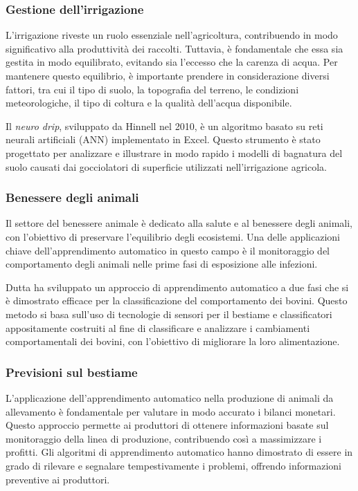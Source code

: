 \subsubsection{Gestione dell'irrigazione}

L'irrigazione riveste un ruolo essenziale nell'agricoltura, contribuendo in modo significativo alla produttività dei raccolti. Tuttavia, è fondamentale che essa sia gestita in modo equilibrato, evitando sia l'eccesso che la carenza di acqua. Per mantenere questo equilibrio, è importante prendere in considerazione diversi fattori, tra cui il tipo di suolo, la topografia del terreno, le condizioni meteorologiche, il tipo di coltura e la qualità dell'acqua disponibile.

Il \textit{neuro drip}, sviluppato da Hinnell nel 2010, è un algoritmo basato su reti neurali artificiali (ANN) implementato in Excel. Questo strumento è stato progettato per analizzare e illustrare in modo rapido i modelli di bagnatura del suolo causati dai gocciolatori di superficie utilizzati nell'irrigazione agricola.

\subsubsection{Benessere degli animali}

Il settore del benessere animale è dedicato alla salute e al benessere degli animali, con l'obiettivo di preservare l'equilibrio degli ecosistemi. Una delle applicazioni chiave dell'apprendimento automatico in questo campo è il monitoraggio del comportamento degli animali nelle prime fasi di esposizione alle infezioni.

Dutta ha sviluppato un approccio di apprendimento automatico a due fasi che si è dimostrato efficace per la classificazione del comportamento dei bovini. Questo metodo si basa sull'uso di tecnologie di sensori per il bestiame e classificatori appositamente costruiti al fine di classificare e analizzare i cambiamenti comportamentali dei bovini, con l'obiettivo di migliorare la loro alimentazione.

\subsubsection{Previsioni sul bestiame}

L'applicazione dell'apprendimento automatico nella produzione di animali da allevamento è fondamentale per valutare in modo accurato i bilanci monetari. Questo approccio permette ai produttori di ottenere informazioni basate sul monitoraggio della linea di produzione, contribuendo così a massimizzare i profitti. Gli algoritmi di apprendimento automatico hanno dimostrato di essere in grado di rilevare e segnalare tempestivamente i problemi, offrendo informazioni preventive ai produttori.

